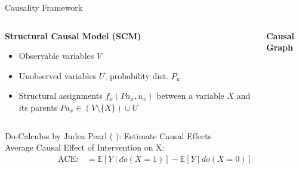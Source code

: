 \documentclass[German, aspectratio=169]{beamer}
\begin{document}
\begin{frame}{Causality Framework}
    \begin{columns}[t]
        \begin{column}{.6\textwidth}
            \textbf{Structural Causal Model (SCM)}
            \begin{itemize}
                \item Observable variables $V$
                \item Unobserved variables $U$,  probability dist. $P_u$
                \item Structural assignments $f_x({Pa}_{x}, u_x)$ between a variable $X$ and its parents ${Pa}_{x} \in (V \setminus \{X\}) \cup U$
            \end{itemize}
        \end{column}
        \begin{column}{.4\textwidth}
            \textbf{Causal Graph}
            \begin{figure}
                \centering
            \end{figure}
        \end{column}
    \end{columns}
    \pause
    Do-Calculus by Judea Pearl (\cite{Pearl2009} ): Estimate Causal Effects\\
    Average Causal Effect of Intervention on X:
    \begin{align*}
        \displaystyle \mathrm{ACE} : & = \mathbb{E} [ Y \ | \ do(X=1) ] - \mathbb{E} [ Y \ | \ do(X=0) ] \\
    \end{align*}
\end{frame}
\end{document}
